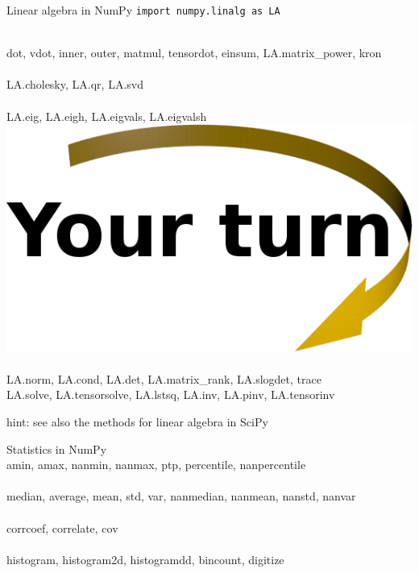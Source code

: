 \documentclass[svgnames]{beamer}
\begin{document}
\begin{frame}{Linear algebra in NumPy}
 \texttt{import numpy.linalg as LA}

 \vspace{0.3truecm}
 \\
 {\small dot, vdot, inner, outer, matmul, tensordot, einsum, LA.matrix\_power,
 kron}\\[0.2truecm]
 \\
 {\small LA.cholesky, LA.qr, LA.svd}\\[0.2truecm]
 \\[-1.32truecm]
 \alert{\small LA.eig, LA.eigh, LA.eigvals, LA.eigvalsh}\qquad
 \includegraphics[width=3truecm]{yourturn}\\[0.2truecm]
 \\
 {\small LA.norm, LA.cond, LA.det, LA.matrix\_rank, LA.slogdet,
 trace}\\[0.2truecm]
 {\small LA.solve, LA.tensorsolve, LA.lstsq, LA.inv, LA.pinv, LA.tensorinv}

 \vspace{0.6truecm}
 hint: see also the methods for linear algebra in SciPy
\end{frame}

\begin{frame}{Statistics in NumPy}
 \\
 \small{amin, amax, nanmin, nanmax, ptp, percentile, nanpercentile}\\[0.2truecm]
 \\
 \small{median, average, mean, std, var, nanmedian, nanmean, nanstd, nanvar}\\[0.2truecm]
 \\
 \small{corrcoef, correlate, cov}\\[0.2truecm]
 \\
 \small{histogram, histogram2d, histogramdd, bincount, digitize}
\end{frame}
\end{document}
